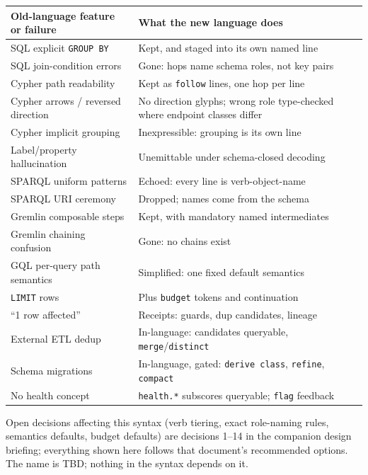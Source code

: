 \documentclass[11pt]{article}
\begin{document}
\begin{center}
\small
\begin{tabular}{>{\raggedright\arraybackslash}p{5.6cm}>{\raggedright\arraybackslash}p{7.8cm}}
\toprule
\textbf{Old-language feature or failure} & \textbf{What the new language does} \\
\midrule
SQL explicit \texttt{GROUP BY} & Kept, and staged into its own named line \\
SQL join-condition errors & Gone: hops name schema roles, not key pairs \\
Cypher path readability & Kept as \texttt{follow} lines, one hop per line \\
Cypher arrows / reversed direction & No direction glyphs; wrong role type-checked where endpoint classes differ \\
Cypher implicit grouping & Inexpressible: grouping is its own line \\
Label/property hallucination & Unemittable under schema-closed decoding \\
SPARQL uniform patterns & Echoed: every line is verb-object-name \\
SPARQL URI ceremony & Dropped; names come from the schema \\
Gremlin composable steps & Kept, with mandatory named intermediates \\
Gremlin chaining confusion & Gone: no chains exist \\
GQL per-query path semantics & Simplified: one fixed default semantics \\
\texttt{LIMIT} rows & Plus \texttt{budget} tokens and continuation \\
``1 row affected'' & Receipts: guards, dup candidates, lineage \\
External ETL dedup & In-language: candidates queryable, \texttt{merge}/\texttt{distinct} \\
Schema migrations & In-language, gated: \texttt{derive class}, \texttt{refine}, \texttt{compact} \\
No health concept & \texttt{health.*} subscores queryable; \texttt{flag} feedback \\
\bottomrule
\end{tabular}
\end{center}

\vspace{4pt}
Open decisions affecting this syntax (verb tiering, exact role-naming rules, semantics defaults, budget defaults) are decisions 1--14 in the companion design briefing; everything shown here follows that document's recommended options. The name is TBD; nothing in the syntax depends on it.
\end{document}
